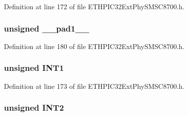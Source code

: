 Definition at line 172 of file E\+T\+H\+P\+I\+C32\+Ext\+Phy\+S\+M\+S\+C8700.\+h.

\hypertarget{union_____i_n_t_s_o_u_r_c_ebits__t_acaf2d0924a107ec6e8d2e31febaf66f9}{}
\subsubsection[{\+\_\+\+\_\+pad1\+\_\+\+\_\+}]{\setlength{\rightskip}{0pt plus 5cm}unsigned \+\_\+\+\_\+pad1\+\_\+\+\_\+}\label{union_____i_n_t_s_o_u_r_c_ebits__t_acaf2d0924a107ec6e8d2e31febaf66f9}


Definition at line 180 of file E\+T\+H\+P\+I\+C32\+Ext\+Phy\+S\+M\+S\+C8700.\+h.

\hypertarget{union_____i_n_t_s_o_u_r_c_ebits__t_a47cc5a5beb081340f905482dc80e00d3}{}
\subsubsection[{I\+N\+T1}]{\setlength{\rightskip}{0pt plus 5cm}unsigned I\+N\+T1}\label{union_____i_n_t_s_o_u_r_c_ebits__t_a47cc5a5beb081340f905482dc80e00d3}


Definition at line 173 of file E\+T\+H\+P\+I\+C32\+Ext\+Phy\+S\+M\+S\+C8700.\+h.

\hypertarget{union_____i_n_t_s_o_u_r_c_ebits__t_a701a787be03bde234890290d2a507f1d}{}
\subsubsection[{I\+N\+T2}]{\setlength{\rightskip}{0pt plus 5cm}unsigned I\+N\+T2}\label{union_____i_n_t_s_o_u_r_c_ebits__t_a701a787be03bde234890290d2a507f1d}


